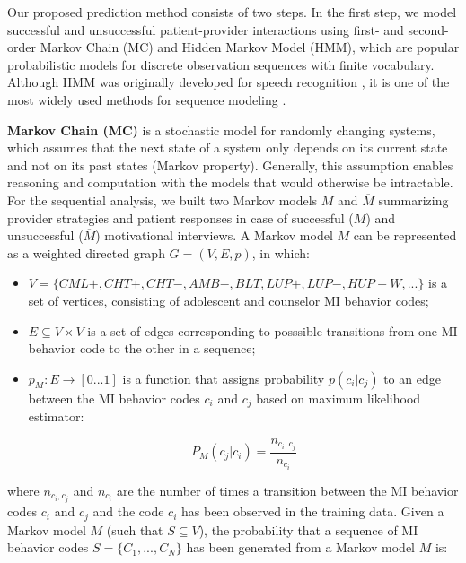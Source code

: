 \documentclass{amia_summit_2018}
\begin{document}
Our proposed prediction method consists of two steps. In the first step, we model successful and unsuccessful patient-provider interactions using first- and second-order Markov Chain (MC) and Hidden Markov Model (HMM), which are popular probabilistic models for discrete observation sequences with finite vocabulary. Although HMM was originally developed for speech recognition \cite{rabiner1989tutorial}, it is one of the most widely used methods for sequence modeling \cite{mutsam2016maximum, eickeler1998hidden, srivastava2007hmm, won2004training, chai2001folk}.

\textbf {Markov Chain (MC)} is a stochastic model for randomly changing systems, which assumes that the next state of a system only depends on its current state and not on its past states (Markov property). Generally, this assumption enables reasoning and computation with the models that would otherwise be intractable. For the sequential analysis, we built two Markov models $M$ and $\overline{M}$ summarizing provider strategies and patient responses in case of successful ($M$) and unsuccessful ($\overline{M}$) motivational interviews. A Markov model $M$ can be represented as a weighted directed graph $G = (V, E, p)$, in which:

\begin{itemize}
\item $V = \{CML+, CHT+, CHT-, AMB-, BLT, LUP+, LUP-, HUP-W, ...\}$ is a set of vertices, consisting of adolescent and counselor MI behavior codes;
\item $E \subseteq V \times V$ is a set of edges corresponding to posssible transitions from one MI behavior code to the other in a sequence;
\item $p_M:E\rightarrow[0...1]$ is a function that assigns probability $p(c_i|c_j)$ to an edge between the MI behavior codes $c_i$ and $c_j$ based on maximum likelihood estimator:

\begin{equation}
P_M(c_j|c_i) = \frac{n_{c_i,c_j}}{n_{c_i}}
\end{equation}

\end{itemize}

where $n_{c_i,c_j}$ and $n_{c_i}$ are the number of times a transition between the MI behavior codes $c_i$ and $c_j$ and the code $c_i$ has been observed in the training data. Given a Markov model $M$ (such that $S\subseteq V$), the probability that a sequence of MI behavior codes $S = \{C_1,...,C_N\}$ has been generated from a Markov model $M$ is:
\end{document}
